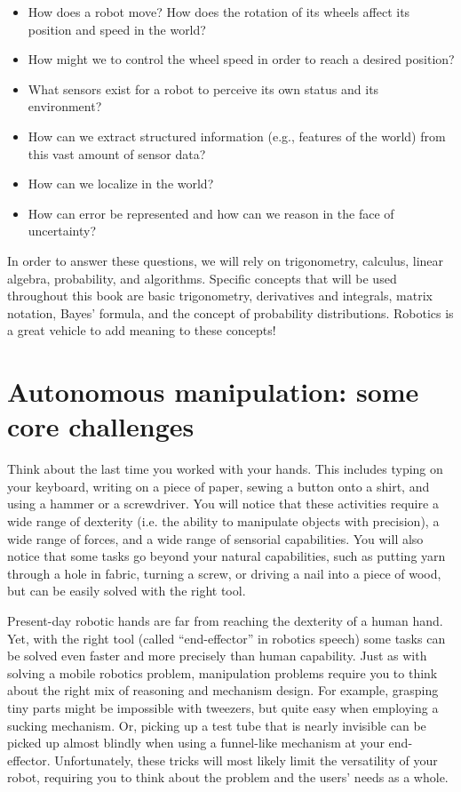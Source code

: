 \begin{itemize}
\item How does a robot move? How does the rotation of its wheels affect its position and speed in the world?
\item How might we to control the wheel speed in order to reach a desired position?
\item What sensors exist for a robot to perceive its own status and its environment?
\item How can we extract structured information (e.g., features of the world) from this vast amount of sensor data?
\item How can we localize in the world?
\item How can error be represented and how can we reason in the face of uncertainty?
\end{itemize}

In order to answer these questions, we will rely on trigonometry, calculus, linear algebra, probability, and algorithms. Specific concepts that will be used throughout this book are basic trigonometry, derivatives and integrals, matrix notation, Bayes' formula, and the concept of probability distributions. Robotics is a great vehicle to add meaning to these concepts!


\section{Autonomous manipulation: some core challenges}
Think about the last time you worked with your hands. This includes typing on your keyboard, writing on a piece of paper, sewing a button onto a shirt, and using a hammer or a screwdriver. You will notice that these activities require a wide range of dexterity (i.e. the ability to manipulate objects with precision), a wide range of forces, and a wide range of sensorial capabilities. You will also notice that some tasks go beyond your natural capabilities, such as putting yarn through a hole in fabric, turning a screw, or driving a nail into a piece of wood, but can be easily solved with the right tool.

Present-day robotic hands are far from reaching the dexterity of a human hand. Yet, with the right tool (called ``end-effector'' in robotics speech)  some tasks can be solved even faster and more precisely than human capability. Just as with solving a mobile robotics problem, manipulation problems require you to think about the right mix of reasoning and mechanism design. For example, grasping tiny parts might be impossible with tweezers, but quite easy when employing a sucking mechanism. Or, picking up a test tube that is nearly invisible can be picked up almost blindly when using a funnel-like mechanism at your end-effector. Unfortunately, these tricks will most likely limit the versatility of your robot, requiring you to think about the problem and the users' needs as a whole.

